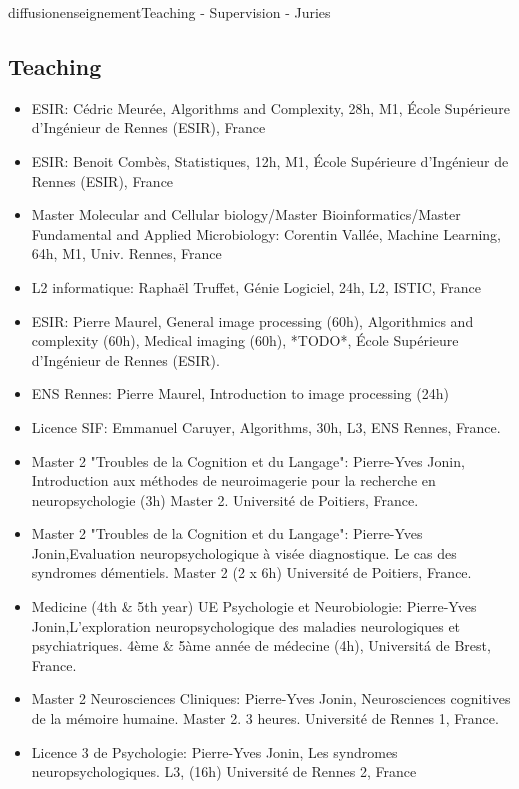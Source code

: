 \documentclass{ra2018}
\begin{document}
\begin{module}{diffusion}{enseignement}{Teaching - Supervision - Juries}

\subsection {Teaching}

\begin{itemize}
    \item ESIR: Cédric Meurée, Algorithms and Complexity, 28h, M1, École Supérieure d’Ingénieur de Rennes (ESIR), France
    \item ESIR: Benoit Combès, Statistiques, 12h, M1, École Supérieure d’Ingénieur de Rennes (ESIR), France
    \item Master Molecular and Cellular biology/Master Bioinformatics/Master Fundamental and Applied Microbiology: Corentin Vallée, Machine Learning, 64h, M1, Univ. Rennes, France
    \item L2 informatique: Raphaël Truffet, Génie Logiciel, 24h, L2, ISTIC, France
    \item ESIR: Pierre Maurel, General image processing (60h), Algorithmics and complexity (60h), Medical imaging (60h), *TODO*, École Supérieure d’Ingénieur de Rennes (ESIR).
    \item ENS Rennes: Pierre Maurel, Introduction to image processing (24h)
    \item Licence SIF: Emmanuel Caruyer, Algorithms, 30h, L3, ENS Rennes, France.
    \item Master 2 "Troubles de la Cognition et du Langage": Pierre-Yves Jonin, Introduction aux méthodes de neuroimagerie pour la recherche en neuropsychologie (3h) Master 2. Université de Poitiers, France.
    \item Master 2 "Troubles de la Cognition et du Langage": Pierre-Yves Jonin,Evaluation neuropsychologique à visée diagnostique. Le cas des syndromes démentiels. Master 2 (2 x 6h) Université de Poitiers, France.
    \item Medicine (4th \& 5th year) UE Psychologie et Neurobiologie: Pierre-Yves Jonin,L'exploration neuropsychologique des maladies neurologiques et psychiatriques. 4\`eme \& 5\`ame année de m\'edecine (4h), Universit\'a de Brest, France.
    \item Master 2 Neurosciences Cliniques: Pierre-Yves Jonin, Neurosciences cognitives de la mémoire humaine. Master 2. 3 heures. Université de Rennes 1, France.
    \item Licence 3 de Psychologie: Pierre-Yves Jonin, Les syndromes neuropsychologiques. L3, (16h) Université de Rennes 2, France

\end{itemize}
\end{module}
\end{document}
